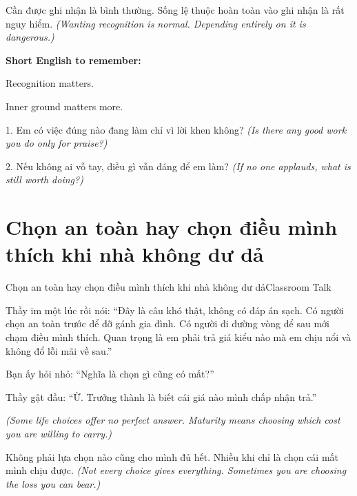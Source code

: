 \begin{baihoc}
Cần được ghi nhận là bình thường. Sống lệ thuộc hoàn toàn vào ghi nhận là rất nguy hiểm.
\textit{(Wanting recognition is normal. Depending entirely on it is dangerous.)}
\end{baihoc}

\begin{ghinhoanh}
\textbf{Short English to remember:}

Recognition matters.

Inner ground matters more.
\end{ghinhoanh}

\begin{tuhocnhanh}
1. Em có việc đúng nào đang làm chỉ vì lời khen không? \textit{(Is there any good work you do only for praise?)}

2. Nếu không ai vỗ tay, điều gì vẫn đáng để em làm? \textit{(If no one applauds, what is still worth doing?)}
\end{tuhocnhanh}
\ngancach

\section{Chọn an toàn hay chọn điều mình thích khi nhà không dư dả}
\begin{truyen}{Chọn an toàn hay chọn điều mình thích khi nhà không dư dả}{Classroom Talk}

Thầy im một lúc rồi nói: ``Đây là câu khó thật, không có đáp án sạch. Có người chọn an toàn trước để đỡ gánh gia đình. Có người đi đường vòng để sau mới chạm điều mình thích. Quan trọng là em phải trả giá kiểu nào mà em chịu nổi và không đổ lỗi mãi về sau.''

Bạn ấy hỏi nhỏ: ``Nghĩa là chọn gì cũng có mất?''

Thầy gật đầu: ``Ừ. Trưởng thành là biết cái giá nào mình chấp nhận trả.''

\textit{(Some life choices offer no perfect answer. Maturity means choosing which cost you are willing to carry.)}
\end{truyen}

\begin{baihoc}
Không phải lựa chọn nào cũng cho mình đủ hết. Nhiều khi chỉ là chọn cái mất mình chịu được.
\textit{(Not every choice gives everything. Sometimes you are choosing the loss you can bear.)}
\end{baihoc}

